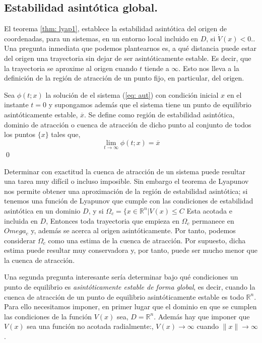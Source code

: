 \subsection{Estabilidad asintótica global.}
El teorema \ref{thm: lyap1}, establece la estabilidad asintótica del origen de coordenadas, para un sistemas, en un entorno local incluido en $D$, si $\dot V(x) < 0.$.  Una pregunta inmediata que podemos plantearnos es, a qué distancia puede estar del origen una trayectoria sin dejar de ser asintóticamente estable. Es decir, que la trayectoria se aproxime al origen cuando $t$ tiende a $\infty$. Esto nos lleva a la definición de la región de atracción de un punto fijo, en particular, del origen.
\begin{definition}
Sea $\phi(t;x)$ la solución de el sistema (\ref{eq: aut}) con condición inicial $x$ en el instante $t=0$ y supongamos además que el sistema tiene un punto de equilibrio asintóticamente estable, $\overline x$. Se define como región de estabilidad asintótica, dominio de atracción o cuenca de atracción de dicho punto al conjunto de todos los puntos $\{x\}$ tales que,
\begin{equation}
\lim_{t \to \infty} \phi(t;x) = \overline x
\end{equation}
\qed
\end{definition}

Determinar con exactitud la cuenca de atracción de un sistema puede resultar una tarea muy difícil o incluso imposible. Sin embargo el teorema de Lyapunov nos permite obtener una aproximación de la región de estabilidad asintótica; si tenemos una función de Lyapunov que cumple con las condiciones de estabilidad asintótica en un dominio $D$, y si $\Omega_c =\{x \in \mathbb{R}^n \vert V(x) \leq C$ Esta acotada e incluida en $D$,  Entonces toda trayectoria que empieza en $\Omega_c$ permanece en $Omega_c$ y, además se acerca al origen asintóticamente. Por tanto, podemos considerar $\Omega_c$ como una estima de la cuenca de atracción. Por supuesto, dicha estima puede resultar muy conservadora y, por  tanto, puede ser mucho menor que la cuenca de atracción.

Una segunda pregunta interesante sería determinar bajo qué condiciones un punto de equilibrio es \emph{asintóticamente estable de forma global}, es decir, cuando la cuenca de atracción de un punto de equilibrio asintóticamente estable es todo $\mathbb{R}^n$.  Para ello necesitamos imponer, en primer lugar que el dominio en que se cumplen las condiciones de la función $V(x)$ sea, $D=\mathbb{R}^n$. Además hay que imponer que   $V(x)$ sea una función no acotada radialmente:, $V(x) \to \infty$ cuando $\|x\| \to \infty$.

